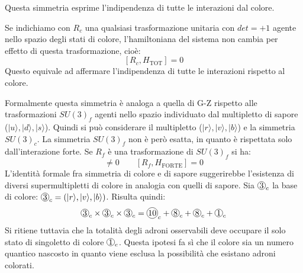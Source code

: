 Questa simmetria esprime l'indipendenza di tutte le interazioni dal colore.

 Se indichiamo con $R_c$ una qualsiasi trasformazione unitaria con $det=+1$ agente nello
spazio degli stati di colore, l'hamiltoniana del sistema non cambia per effetto di questa trasformazione, cioè:
\[
[R_c,H_{\text{TOT}}]=0
\]
Questo equivale ad affermare l'indipendenza di tutte le interazioni rispetto al colore.

Formalmente questa simmetria è analoga a quella di G-Z rispetto alle trasformazioni $SU(3)_f$ agenti nello
spazio individuato dal multipletto di sapore ($|u\rangle,|d\rangle,|s\rangle$).
Quindi si può considerare il multipletto ($|r\rangle,|v\rangle,|b\rangle$) e la simmetria $SU(3)_c$. La
simmetria $SU(3)_f$ non è però esatta, in quanto è rispettata solo dall'interazione forte. Se $R_f$ è una
trasformazione di $SU(3)_f$ si ha:
\begin{equation}
[R_f,H_{\text{TOT}}]\neq 0\qquad[R_f,H_{\text{FORTE}}]=0
\end{equation}
L'identità formale fra simmetria di colore e di sapore suggerirebbe l'esistenza di diversi supermultipletti
di colore in analogia con quelli di sapore. Sia $\Ci{3}_c$ la base di colore:
$\Ci{3}_c=(|r\rangle,|v\rangle,|b\rangle)$. Risulta quindi:
\begin{equation}
\Ci{3}_c\times\Ci{3}_c\times\Ci{3}_c=\Ci{10}_c+\Ci{8}_c+\Ci{8}_c+\Ci{1}_c
\end{equation}
Si ritiene tuttavia che la totalità degli adroni osservabili deve occupare il solo stato di singoletto di colore $\Ci{1}_c$.
Questa ipotesi fa sì che il colore sia un numero quantico nascosto in quanto viene esclusa la possibilità che
esistano adroni colorati.

